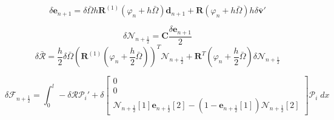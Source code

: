 \documentclass{article}
\newcommand{\dep}[1]{{\scriptstyle(#1)}}
\begin{document}
$$\delta\mathbf{e}_{n+1} = \delta\bar{\Omega} h \mathbf{R}^{(1)}\dep{\varphi_n+h\bar{\Omega}}\mathbf{d}_{n+1} + \mathbf{R}\dep{\varphi_n+h\bar{\Omega}}h\delta\bar{\mathbf{v}}'$$

$$ \delta \mathcal{N}_{n+\frac{1}{2}} = \mathbf{C}\frac{\delta\mathbf{e}_{n+1}}{2}$$
$$ \delta\bar{\mathcal{R}} = \frac{h}{2}\delta\bar{\Omega}(\mathbf{R}^{(1)}\dep{\varphi_n+\frac{h}{2}\bar{\Omega}})^T\mathcal{N}_{n+\frac{1}{2}} + \mathbf{R}^T\dep{\varphi_n+\frac{h}{2}\bar{\Omega}}\delta\mathcal{N}_{n+\frac{1}{2}}$$ 

$$\delta \mathcal{F}_{n+\frac{1}{2}} = \int_0^l- \delta \mathcal{RP}_i' + \delta{\scriptscriptstyle \begin{bmatrix} 0 \\ 0 \\ \mathcal{N}_{n+\frac{1}{2}}[1]\mathbf{e}_{n+\frac{1}{2}}[2] - (1-\mathbf{e}_{n+\frac{1}{2}}[1])\mathcal{N}_{n+\frac{1}{2}}[2] \end{bmatrix}}\mathcal{P}_i\; dx$$
\end{document}
